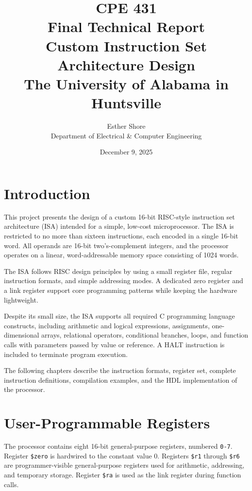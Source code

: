 \documentclass[12pt]{report}
\title{
    \textbf{CPE 431 \\ Final Technical Report} \\
    \vspace{0.5cm}
    \textbf{Custom Instruction Set Architecture Design} \\
    \vspace{1cm}
    \large The University of Alabama in Huntsville
}
\author{Esther Shore \\
Department of Electrical \& Computer Engineering}
\date{December 9, 2025}
\begin{document}
\maketitle
{}
\tableofcontents
\clearpage
{}

\chapter{Introduction}

This project presents the design of a custom 16-bit RISC-style instruction set
architecture (ISA) intended for a simple, low-cost microprocessor. The ISA is
restricted to no more than sixteen instructions, each encoded in a single
16-bit word. All operands are 16-bit two's-complement integers, and the
processor operates on a linear, word-addressable memory space consisting of
1024 words.

The ISA follows RISC design principles by using a small register file,
regular instruction formats, and simple addressing modes. A dedicated zero
register and a link register support core programming patterns while keeping
the hardware lightweight.

Despite its small size, the ISA supports all required C programming language
constructs, including arithmetic and logical expressions, assignments,
one-dimensional arrays, relational operators, conditional branches, loops, and
function calls with parameters passed by value or reference. A HALT
instruction is included to terminate program execution.

The following chapters describe the instruction formats, register set,
complete instruction definitions, compilation examples, and the HDL
implementation of the processor.


\chapter{User-Programmable Registers}

The processor contains eight 16-bit general-purpose registers, numbered \texttt{0-7}.
Register \texttt{\$zero} is hardwired to the constant value 0. Registers \texttt{\$r1}
through \texttt{\$r6} are programmer-visible general-purpose registers used for
arithmetic, addressing, and temporary storage. Register \texttt{\$ra} is used
as the link register during function calls.
\end{document}
